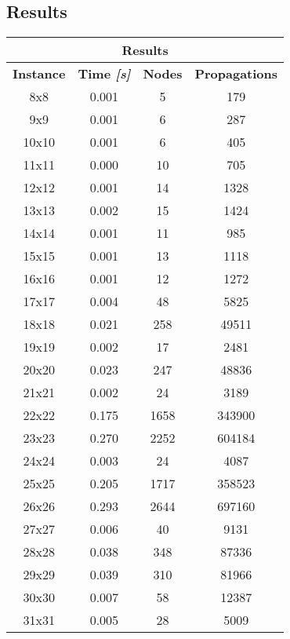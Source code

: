 \subsection{Results}
\begin{center}
    \begin{tabular}{|c|c|c|c|}
        \hline
        \multicolumn{4}{|c|}{\textbf{Results}} \\
        \hline
        \textbf{Instance} & \textbf{Time \textit{[s]}} & \textbf{Nodes} & \textbf{Propagations} \\
        \hline
        8x8 & 0.001 & 5 & 179 \\ \hline
        9x9 & 0.001 & 6 & 287 \\ \hline
        10x10 & 0.001 & 6 & 405 \\ \hline
        11x11 & 0.000 & 10 & 705 \\ \hline
        12x12 & 0.001 & 14 & 1328 \\ \hline
        13x13 & 0.002 & 15 & 1424 \\ \hline
        14x14 & 0.001 & 11 & 985 \\ \hline
        15x15 & 0.001 & 13 & 1118 \\ \hline
        16x16 & 0.001 & 12 & 1272 \\ \hline
        17x17 & 0.004 & 48 & 5825 \\ \hline
        18x18 & 0.021 & 258 & 49511 \\ \hline
        19x19 & 0.002 & 17 & 2481 \\ \hline
        20x20 & 0.023 & 247 & 48836 \\ \hline
        21x21 & 0.002 & 24 & 3189 \\ \hline
        22x22 & 0.175 & 1658 & 343900 \\ \hline
        23x23 & 0.270 & 2252 & 604184 \\ \hline
        24x24 & 0.003 & 24 & 4087 \\ \hline
        25x25 & 0.205 & 1717 & 358523 \\ \hline
        26x26 & 0.293 & 2644 & 697160 \\ \hline
        27x27 & 0.006 & 40 & 9131 \\ \hline
        28x28 & 0.038 & 348 & 87336 \\ \hline
        29x29 & 0.039 & 310 & 81966 \\ \hline
        30x30 & 0.007 & 58 & 12387 \\ \hline
        31x31 & 0.005 & 28 & 5009 \\ \hline

\end{tabular}
\end{center}
